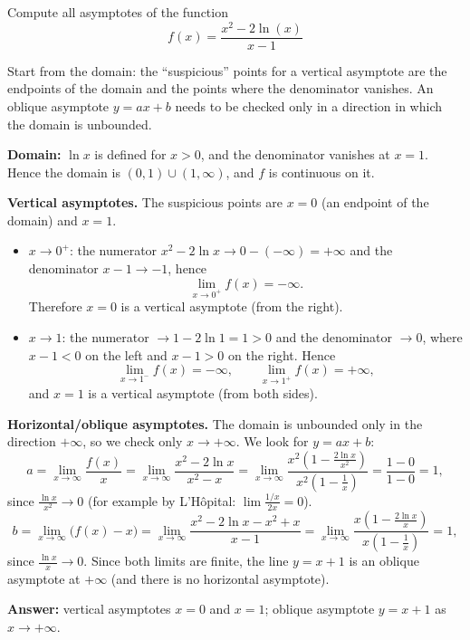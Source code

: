 
\begin{question}
Compute all asymptotes of the function
\[ f(x) = \frac{x^2 - 2\ln(x)}{x - 1} \]
\end{question}

\begin{hint}
Start from the domain: the ``suspicious'' points for a vertical asymptote are the endpoints of the domain and the points where the denominator vanishes. An oblique asymptote $y = ax + b$ needs to be checked only in a direction in which the domain is unbounded.
\end{hint}

\begin{solution}
\textbf{Domain:} $\ln x$ is defined for $x > 0$, and the denominator vanishes at $x = 1$. Hence the domain is $(0,1)\cup(1,\infty)$, and $f$ is continuous on it.

\textbf{Vertical asymptotes.} The suspicious points are $x = 0$ (an endpoint of the domain) and $x = 1$.
\begin{itemize}
  \item $x \to 0^+$: the numerator $x^2 - 2\ln x \to 0 - (-\infty) = +\infty$ and the denominator $x - 1 \to -1$, hence
  \[ \lim_{x\to 0^+} f(x) = -\infty. \]
  Therefore $x = 0$ is a vertical asymptote (from the right).
  \item $x \to 1$: the numerator $\to 1 - 2\ln 1 = 1 > 0$ and the denominator $\to 0$, where $x - 1 < 0$ on the left and $x - 1 > 0$ on the right. Hence
  \[ \lim_{x\to 1^-} f(x) = -\infty, \qquad \lim_{x\to 1^+} f(x) = +\infty, \]
  and $x = 1$ is a vertical asymptote (from both sides).
\end{itemize}

\textbf{Horizontal/oblique asymptotes.} The domain is unbounded only in the direction $+\infty$, so we check only $x \to +\infty$. We look for $y = ax + b$:
\[ a = \lim_{x\to\infty} \frac{f(x)}{x} = \lim_{x\to\infty} \frac{x^2 - 2\ln x}{x^2 - x}
     = \lim_{x\to\infty} \frac{x^2\left(1 - \frac{2\ln x}{x^2}\right)}{x^2\left(1 - \frac{1}{x}\right)} = \frac{1 - 0}{1 - 0} = 1, \]
since $\frac{\ln x}{x^2} \to 0$ (for example by L'Hôpital: $\lim \frac{1/x}{2x} = 0$).
\[ b = \lim_{x\to\infty} \bigl(f(x) - x\bigr) = \lim_{x\to\infty} \frac{x^2 - 2\ln x - x^2 + x}{x - 1}
     = \lim_{x\to\infty} \frac{x\left(1 - \frac{2\ln x}{x}\right)}{x\left(1 - \frac{1}{x}\right)} = 1, \]
since $\frac{\ln x}{x} \to 0$. Since both limits are finite, the line $y = x + 1$ is an oblique asymptote at $+\infty$ (and there is no horizontal asymptote).

\textbf{Answer:} vertical asymptotes $x = 0$ and $x = 1$; oblique asymptote $y = x + 1$ as $x \to +\infty$.
\end{solution}
